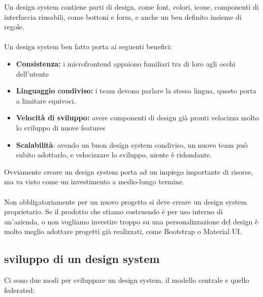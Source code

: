 Un design system contiene parti di design, come font, colori, icone, componenti di interfaccia riusabili, come bottoni 
e form, e anche un ben definito insieme di regole.
\\\\
Un design system ben fatto porta ai seguenti benefici:
\begin{itemize}
    \item \textbf{Consistenza:} i microfrontend appaiono familiari tra di loro agli occhi dell’utente
    \item \textbf{Linguaggio condiviso:} i team devono parlare la stessa lingua, questo porta a limitare equivoci.
    \item \textbf{Velocità di sviluppo:} avere componenti di design già pronti velocizza molto lo sviluppo di nuove features
    \item \textbf{Scalabilità}: avendo un buon design system condiviso, un nuovo team può subito adottarlo, e velocizzare lo sviluppo, niente è ridondante.
\end{itemize}
Ovviamente creare un design system porta ad un impiego importante di risorse, ma va visto come un investimento a medio-lungo termine.
\\\\
Non obbligatoriamente per un nuovo progetto si deve creare un design system proprietario.
Se il prodotto che stiamo costruendo è per uso interno di un’azienda, o non vogliamo investire troppo su una personalizzazione del design è molto meglio adottare progetti
 già realizzati, come Bootstrap o Material UI.

\subsection{sviluppo di un design system}
Ci sono due modi per sviluppare un design system, il modello centrale e quello federated:

